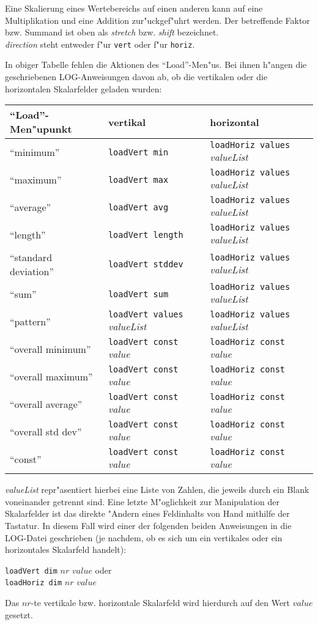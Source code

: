 Eine Skalierung eines Wertebereichs auf einen anderen kann auf
eine Multiplikation und eine Addition zur"uckgef"uhrt werden.
Der betreffende Faktor bzw. Summand ist oben als {\it stretch} bzw.
{\it shift} bezeichnet. \\
{\it direction} steht entweder f"ur {\tt vert} oder f"ur {\tt horiz}.

In obiger Tabelle fehlen die Aktionen des "`Load"'-Men"us.
Bei ihnen h"angen die geschriebenen LOG-Anweisungen davon ab, ob die vertikalen
oder die horizontalen Skalarfelder geladen wurden:

\begin{tabular}{l|l|l}
{\bf "`Load"'-Men"upunkt} & {\bf vertikal} & {\bf horizontal} \\ \hline
"`minimum"' & {\tt loadVert min} & {\tt loadHoriz values} {\it valueList} \\
"`maximum"' & {\tt loadVert max} & {\tt loadHoriz values} {\it valueList} \\
"`average"' & {\tt loadVert avg} & {\tt loadHoriz values} {\it valueList} \\
"`length"' & {\tt loadVert length} & {\tt loadHoriz values} {\it valueList} \\
"`standard deviation"' & {\tt loadVert stddev} & {\tt loadHoriz values} 
{\it valueList} \\
"`sum"' & {\tt loadVert sum} & {\tt loadHoriz values} {\it valueList} \\
"`pattern"' & {\tt loadVert values} {\it valueList} &
{\tt loadHoriz values} {\it valueList} \\
"`overall minimum"' & {\tt loadVert const} {\it value} &
{\tt loadHoriz const} {\it value} \\   
"`overall maximum"' & {\tt loadVert const} {\it value} &
{\tt loadHoriz const} {\it value} \\   
"`overall average"' & {\tt loadVert const} {\it value} &
{\tt loadHoriz const} {\it value} \\   
"`overall std dev"' & {\tt loadVert const} {\it value} &
{\tt loadHoriz const} {\it value} \\   
"`const"' & {\tt loadVert const} {\it value} & 
{\tt loadHoriz const} {\it value} \\ 
\end{tabular}

{\it valueList} repr"asentiert hierbei eine Liste von Zahlen, die jeweils 
durch ein Blank voneinander getrennt sind.
Eine letzte M"oglichkeit zur Manipulation der Skalarfelder ist 
das direkte "Andern eines Feldinhalts von Hand mithilfe der Tastatur.
In diesem Fall wird einer der folgenden beiden Anweisungen in die
LOG-Datei geschrieben (je nachdem, ob es sich um ein vertikales oder
ein horizontales Skalarfeld handelt):

{\tt loadVert dim} \enspace $nr$ \enspace $value$ \qquad oder \\
{\tt loadHoriz dim} \enspace $nr$ \enspace $value$  

Das $nr$-te vertikale bzw. horizontale Skalarfeld wird hierdurch auf
den Wert $value$ gesetzt.